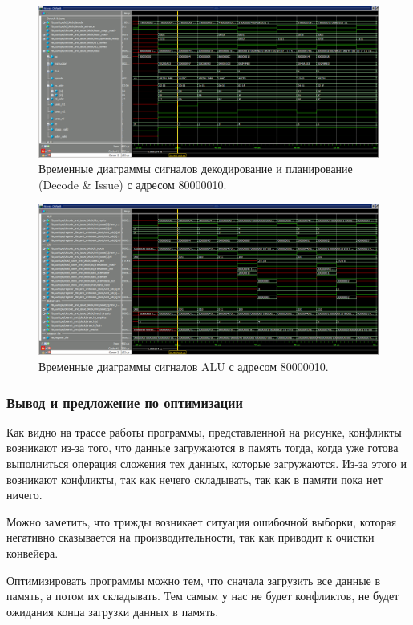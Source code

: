\begin{figure}[h]
	\centering
	\includegraphics[height=0.3\textheight]{img/t5-decode}
	\caption{Временные диаграммы сигналов декодирование и планирование (Decode \& Issue) с адресом 80000010.}
	\label{img:t5-decode}
\end{figure}

\begin{figure}[h]
	\centering
	\includegraphics[height=0.3\textheight]{img/t5-alu}
	\caption{Временные диаграммы сигналов ALU с адресом 80000010.}
	\label{img:t5-alu}
\end{figure}

\subsubsection*{Вывод и предложение по оптимизации}
Как видно на трассе работы программы, представленной на рисунке, конфликты возникают из-за того, что данные загружаются в память тогда, когда уже готова выполниться операция сложения тех данных, которые загружаются. Из-за этого и возникают конфликты, так как нечего складывать, так как в памяти пока нет ничего. 

Можно заметить, что трижды возникает ситуация ошибочной выборки, которая негативно сказывается на производительности, так как приводит к очистки конвейера.

Оптимизировать программы можно тем, что сначала загрузить все данные в память, а потом их складывать. Тем самым у нас не будет конфликтов, не будет ожидания конца загрузки данных в память.

